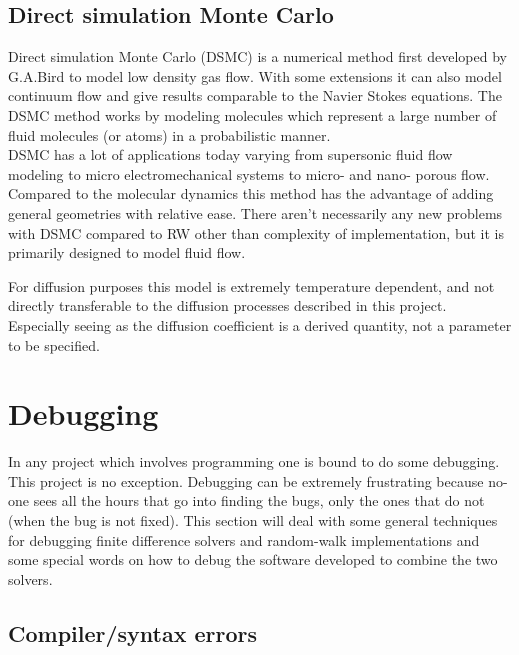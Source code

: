 \subsection{Direct simulation Monte Carlo}\label{DSMC_description}
Direct simulation Monte Carlo (DSMC) is a numerical method first developed by G.A.Bird to model low density gas flow. 
With some extensions it can also model continuum flow and give results comparable to the Navier Stokes equations. 
The DSMC method works by modeling molecules which represent a large number of fluid molecules (or atoms) in a probabilistic manner. \\
DSMC has a lot of applications today varying from supersonic fluid flow modeling to micro electromechanical systems to micro- and nano- porous flow. \\

Compared to the molecular dynamics this method has the advantage of adding general geometries with relative ease. 
There aren't necessarily any new problems with DSMC compared to RW other than complexity of implementation, but it is primarily designed to model fluid flow. 

For diffusion purposes this model is extremely temperature dependent, and not directly transferable to the diffusion processes described in this project. 
Especially seeing as the diffusion coefficient is a derived quantity, not a parameter to be specified.


\section{Debugging}\label{debugging}

In any project which involves programming one is bound to do some debugging. This project is no exception. 
Debugging can be extremely frustrating because no-one sees all the hours that go into finding the bugs, only the ones that do not (when the bug is not fixed). 
This section will deal with some general techniques for debugging finite difference solvers and random-walk implementations and some special words on how to debug the software developed to combine the two solvers.

\subsection{Compiler/syntax errors}

